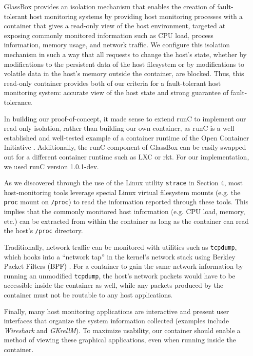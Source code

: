 \documentclass{proc}
\begin{document}
GlassBox provides an isolation mechanism that enables the creation of fault-tolerant host monitoring systems by providing host monitoring processes with a container that gives a read-only view of the host environment, targeted at exposing commonly monitored information such as CPU load, process information, memory usage, and network traffic. We configure this isolation mechanism in such a way that all requests to change the host's state, whether by modifications to the persistent data of the host filesystem or by modifications to volatile data in the host's memory outside the container, are blocked. Thus, this read-only container provides both of our criteria for a fault-tolerant host monitoring system: accurate view of the host state and strong guarantee of fault-tolerance.

In building our proof-of-concept, it made sense to extend runC to implement our read-only isolation, rather than building our own container, as runC is a well-established and well-tested example of a container runtime of the Open Container Initiative \cite{opencontainerinitiative}. Additionally, the runC component of GlassBox can be easily swapped out for a different container runtime such as LXC or rkt. For our implementation, we used runC version 1.0.1-dev.

As we discovered through the use of the Linux utility \texttt{strace} in Section 4, most host-monitoring tools leverage special Linux virtual filesystem mounts (e.g. the \texttt{proc} mount on \texttt{/proc}) to read the information reported through these tools. This implies that the commonly monitored host information (e.g. CPU load, memory, etc.) can be extracted from within the container as long as the container can read the host's \texttt{/proc} directory.

Traditionally, network traffic can be monitored with utilities such as \texttt{tcpdump}, which hooks into a ``network tap'' in the kernel's network stack using Berkley Packet Filters (BPF) \cite{bsdpacketfilter}. For a container to gain the same network information by running an unmodified \texttt{tcpdump}, the host's network packets would have to be accessible inside the container as well, while any packets produced by the container must not be routable to any host applications.

Finally, many host monitoring applications are interactive and present user interfaces that organize the system information collected (examples include \textit{Wireshark} and \textit{GKrellM}). To maximize usability, our container should enable a method of viewing these graphical applications, even when running inside the container.
\end{document}
